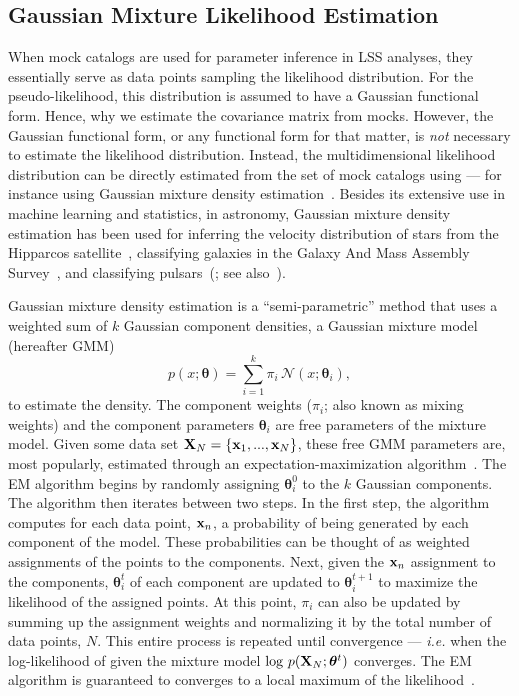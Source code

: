 \documentclass[12pt, letterpaper, preprint]{aastex}
\newcommand{\beq}{\begin{equation}}
\newcommand{\eeq}{\end{equation}}
\begin{document}
\subsection{Gaussian Mixture Likelihood Estimation} \label{sec:gmm}
When mock catalogs are used for parameter inference in LSS analyses, 
they essentially serve as data points sampling the likelihood distribution. 
For the pseudo-likelihood, this distribution is assumed to have a 
Gaussian functional form. Hence, why we estimate the covariance matrix 
from mocks. However, the Gaussian functional form, or any functional form for 
that matter, is \emph{not} necessary to estimate the likelihood distribution. 
Instead, the multidimensional likelihood distribution 
can be directly estimated from the set of mock catalogs using --- for 
instance using Gaussian mixture density 
estimation~\citep{Press:1992:NRC:148286,9780471006268}. 
Besides its extensive use in machine learning and statistics, 
in astronomy, Gaussian mixture density estimation has been used for 
inferring the velocity distribution of stars from the Hipparcos 
satellite~\citep{bovy2011}, classifying galaxies in the Galaxy And Mass Assembly 
Survey~\citep{taylor2015}, and classifying pulsars~(\citealt{lee2012}; see
also~\citealt{hogg2010,kuhn2017}). 

Gaussian mixture density estimation is a ``semi-parametric'' method 
that uses a weighted sum of $k$ Gaussian component densities, a Gaussian 
mixture model (hereafter GMM)
\beq
p(x; \bm{\theta}) = \sum\limits_{i=1}^{k} \pi_i\, \mathcal{N}(x; \bm{\theta}_i),
\eeq
to estimate the density. 
The component weights ($\pi_i$; also known as mixing weights) and the 
component parameters $\bm{\theta}_i$ are free parameters of the mixture 
model. Given some data set ${\bf X}_N = \{{\bf x}_1,..., {\bf x}_N \}$, 
these free GMM parameters are, most popularly, estimated 
through an expectation-maximization algorithm~\citep[EM;][]{dempster1977, neal1998}.
The EM algorithm begins by randomly assigning $\bm{\theta}^0_i$ to the 
$k$ Gaussian components. The algorithm then iterates between two steps. 
In the first step, the algorithm computes for each data point, ${\bf x}_n$, 
a probability of being generated by each component of the model. These 
probabilities can be thought of as weighted assignments of the points 
to the components. Next, given the ${\bf x}_n$ assignment to the 
components, $\bm{\theta}^t_i$ of each component are updated to $\bm{\theta}^{t+1}_i$
to maximize the likelihood of the assigned points. At this point, $\pi_i$ 
can also be updated by summing up the assignment weights and 
normalizing it by the total number of data points, $N$. This entire
process is repeated until convergence --- \emph{i.e.} when the log-likelihood of 
given the mixture model $\log\,p({\bf X}_N; \bm{\theta}^t)$ %
converges. The EM algorithm is guaranteed to converges to a local maximum 
of the likelihood~\citep{wu1983}. 
\end{document}
